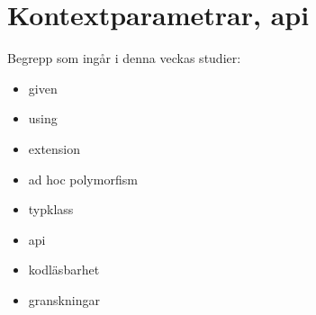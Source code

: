 \chapter{Kontextparametrar, api}\label{chapter:W11}
Begrepp som ingår i denna veckas studier:
\begin{itemize}[noitemsep,label={$\square$},leftmargin=*]
\item given
\item using
\item extension
\item ad hoc polymorfism
\item typklass
\item api
\item kodläsbarhet
\item granskningar\end{itemize}

